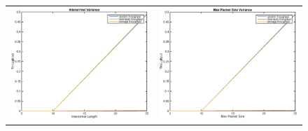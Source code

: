 \begin{figure}
\begin{center}
\begin{tabular}{cc}

\includegraphics[scale=0.35]{../../src/fig-simulation_random_download-interarival-1_0_5_0_1_1_25.eps} & \includegraphics[scale=0.35]{../../src/fig-simulation_random_download-maxpackets-1_0_5_0_1_1_25.eps} \\

\end{tabular}
\end{center}
\end{figure}
